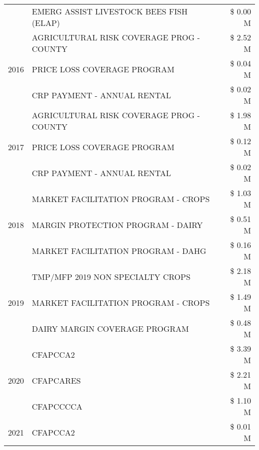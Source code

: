 \begin{tabular}{llr}
 & EMERG ASSIST LIVESTOCK BEES FISH (ELAP) & \$ 0.00 M \\
\cline{1-3}
\multirow[t]{3}{*}{2016} & AGRICULTURAL RISK COVERAGE PROG - COUNTY & \$ 2.52 M \\
 & PRICE LOSS COVERAGE PROGRAM & \$ 0.04 M \\
 & CRP PAYMENT - ANNUAL RENTAL & \$ 0.02 M \\
\cline{1-3}
\multirow[t]{3}{*}{2017} & AGRICULTURAL RISK COVERAGE PROG - COUNTY & \$ 1.98 M \\
 & PRICE LOSS COVERAGE PROGRAM & \$ 0.12 M \\
 & CRP PAYMENT - ANNUAL RENTAL & \$ 0.02 M \\
\cline{1-3}
\multirow[t]{3}{*}{2018} & MARKET FACILITATION PROGRAM - CROPS & \$ 1.03 M \\
 & MARGIN PROTECTION PROGRAM - DAIRY & \$ 0.51 M \\
 & MARKET FACILITATION PROGRAM - DAHG & \$ 0.16 M \\
\cline{1-3}
\multirow[t]{3}{*}{2019} & TMP/MFP 2019 NON SPECIALTY CROPS & \$ 2.18 M \\
 & MARKET FACILITATION PROGRAM - CROPS & \$ 1.49 M \\
 & DAIRY MARGIN COVERAGE PROGRAM & \$ 0.48 M \\
\cline{1-3}
\multirow[t]{3}{*}{2020} & CFAPCCA2 & \$ 3.39 M \\
 & CFAPCARES & \$ 2.21 M \\
 & CFAPCCCCA & \$ 1.10 M \\
\cline{1-3}
2021 & CFAPCCA2 & \$ 0.01 M \\
\cline{1-3}
\bottomrule
\end{tabular}
